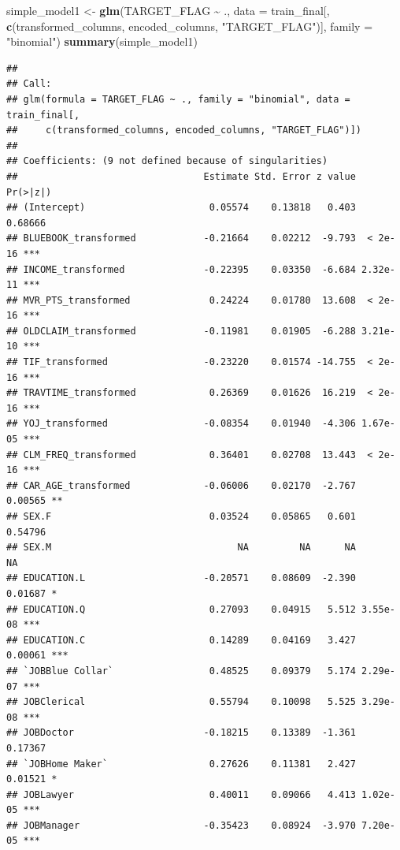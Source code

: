 \documentclass[
]{article}
\newenvironment{Shaded}{\begin{snugshade}}{\end{snugshade}}
\newcommand{\AttributeTok}[1]{\textcolor[rgb]{0.13,0.29,0.53}{#1}}
\newcommand{\FunctionTok}[1]{\textcolor[rgb]{0.13,0.29,0.53}{\textbf{#1}}}
\newcommand{\NormalTok}[1]{#1}
\newcommand{\OtherTok}[1]{\textcolor[rgb]{0.56,0.35,0.01}{#1}}
\newcommand{\SpecialCharTok}[1]{\textcolor[rgb]{0.81,0.36,0.00}{\textbf{#1}}}
\newcommand{\StringTok}[1]{\textcolor[rgb]{0.31,0.60,0.02}{#1}}
\begin{document}
\begin{Shaded}
\begin{Highlighting}[]
\NormalTok{simple\_model1 }\OtherTok{\textless{}{-}} \FunctionTok{glm}\NormalTok{(TARGET\_FLAG }\SpecialCharTok{\textasciitilde{}}\NormalTok{ ., }\AttributeTok{data =}\NormalTok{ train\_final[, }\FunctionTok{c}\NormalTok{(transformed\_columns, encoded\_columns, }\StringTok{"TARGET\_FLAG"}\NormalTok{)], }\AttributeTok{family =} \StringTok{"binomial"}\NormalTok{)}
\FunctionTok{summary}\NormalTok{(simple\_model1)}
\end{Highlighting}
\end{Shaded}

\begin{verbatim}
## 
## Call:
## glm(formula = TARGET_FLAG ~ ., family = "binomial", data = train_final[, 
##     c(transformed_columns, encoded_columns, "TARGET_FLAG")])
## 
## Coefficients: (9 not defined because of singularities)
##                                 Estimate Std. Error z value Pr(>|z|)    
## (Intercept)                      0.05574    0.13818   0.403  0.68666    
## BLUEBOOK_transformed            -0.21664    0.02212  -9.793  < 2e-16 ***
## INCOME_transformed              -0.22395    0.03350  -6.684 2.32e-11 ***
## MVR_PTS_transformed              0.24224    0.01780  13.608  < 2e-16 ***
## OLDCLAIM_transformed            -0.11981    0.01905  -6.288 3.21e-10 ***
## TIF_transformed                 -0.23220    0.01574 -14.755  < 2e-16 ***
## TRAVTIME_transformed             0.26369    0.01626  16.219  < 2e-16 ***
## YOJ_transformed                 -0.08354    0.01940  -4.306 1.67e-05 ***
## CLM_FREQ_transformed             0.36401    0.02708  13.443  < 2e-16 ***
## CAR_AGE_transformed             -0.06006    0.02170  -2.767  0.00565 ** 
## SEX.F                            0.03524    0.05865   0.601  0.54796    
## SEX.M                                 NA         NA      NA       NA    
## EDUCATION.L                     -0.20571    0.08609  -2.390  0.01687 *  
## EDUCATION.Q                      0.27093    0.04915   5.512 3.55e-08 ***
## EDUCATION.C                      0.14289    0.04169   3.427  0.00061 ***
## `JOBBlue Collar`                 0.48525    0.09379   5.174 2.29e-07 ***
## JOBClerical                      0.55794    0.10098   5.525 3.29e-08 ***
## JOBDoctor                       -0.18215    0.13389  -1.361  0.17367    
## `JOBHome Maker`                  0.27626    0.11381   2.427  0.01521 *  
## JOBLawyer                        0.40011    0.09066   4.413 1.02e-05 ***
## JOBManager                      -0.35423    0.08924  -3.970 7.20e-05 ***

\end{verbatim}
\end{document}
